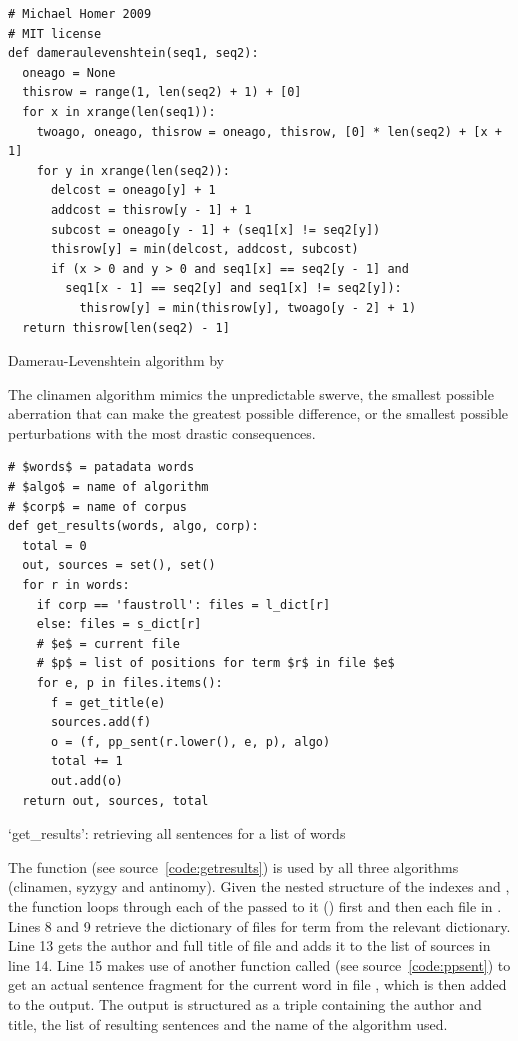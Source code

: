 \begin{listing}
  \begin{verbatim}
# Michael Homer 2009
# MIT license
def dameraulevenshtein(seq1, seq2):
  oneago = None
  thisrow = range(1, len(seq2) + 1) + [0]
  for x in xrange(len(seq1)):
    twoago, oneago, thisrow = oneago, thisrow, [0] * len(seq2) + [x + 1]
    for y in xrange(len(seq2)):
      delcost = oneago[y] + 1
      addcost = thisrow[y - 1] + 1
      subcost = oneago[y - 1] + (seq1[x] != seq2[y])
      thisrow[y] = min(delcost, addcost, subcost)
      if (x > 0 and y > 0 and seq1[x] == seq2[y - 1] and
        seq1[x - 1] == seq2[y] and seq1[x] != seq2[y]):
          thisrow[y] = min(thisrow[y], twoago[y - 2] + 1)
  return thisrow[len(seq2) - 1]
  \end{verbatim}
\caption[`dameraulevenshtein' function]{Damerau-Levenshtein algorithm by \autocite{Homer2009}}
\label{code:dl}
\end{listing}

The clinamen algorithm mimics the unpredictable swerve, the smallest possible aberration that can make the greatest possible difference, or the smallest possible perturbations with the most drastic consequences. 

\spirals


\begin{listing}
  \begin{verbatim}
# $words$ = patadata words
# $algo$ = name of algorithm
# $corp$ = name of corpus
def get_results(words, algo, corp):
  total = 0
  out, sources = set(), set()
  for r in words:
    if corp == 'faustroll': files = l_dict[r]
    else: files = s_dict[r]
    # $e$ = current file
    # $p$ = list of positions for term $r$ in file $e$
    for e, p in files.items():
      f = get_title(e)
      sources.add(f)
      o = (f, pp_sent(r.lower(), e, p), algo)
      total += 1
      out.add(o)
  return out, sources, total
  \end{verbatim}
\caption[`get\_results' function]{`get\_results': retrieving all sentences for a list of words}
\label{code:getresults}
\end{listing}

The  function (see source~\ref{code:getresults}) is used by all three algorithms (clinamen, syzygy and antinomy). Given the nested structure of the indexes  and , the function loops through each of the  passed to it () first and then each file in . Lines 8 and 9 retrieve the dictionary of files for term  from the relevant dictionary. Line 13 gets the author and full title of file  and adds it to the list of sources in line 14. Line 15 makes use of another function called  (see source~\ref{code:ppsent}) to get an actual sentence fragment for the current word  in file , which is then added to the output. The output is structured as a triple containing the author and title, the list of resulting sentences and the name of the algorithm used.

